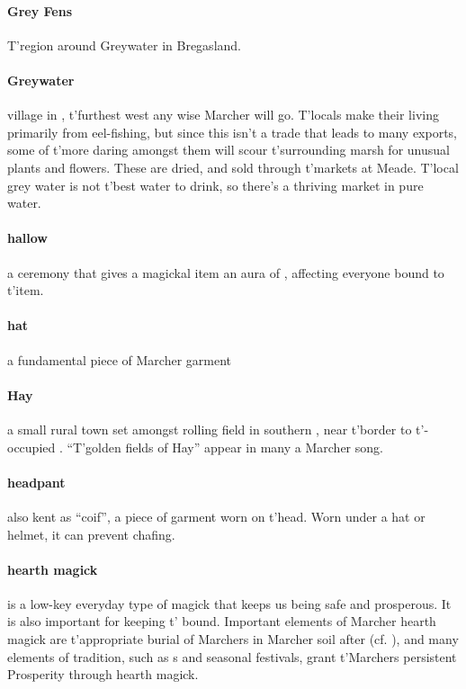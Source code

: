 \paragraph{Grey Fens} T'region around Greywater in Bregasland.
\paragraph{Greywater} village in , t'\allowbreak furthest west any wise Marcher will go. T'locals make their living primarily from eel-fishing, but since this isn’t a trade that leads to many exports, some of t'\allowbreak more daring amongst them will scour t'\allowbreak surrounding marsh for unusual plants and flowers. These are dried, and sold through t'\allowbreak markets at Meade. T'local grey water is not t'\allowbreak best water to drink, so there's a thriving market in pure water.
\paragraph{hallow} a ceremony that gives a magickal item an aura of , affecting everyone bound to t'\allowbreak item.
\paragraph{hat} a fundamental piece of Marcher garment 
\paragraph{Hay} a small rural town set amongst rolling field in southern , near t'\allowbreak border to t'\allowbreak {}-occupied . “T'golden fields of Hay” appear in many a Marcher song.
\paragraph{headpant} also kent as “coif”, a piece of garment worn on t'\allowbreak head. Worn under a hat or helmet, it can prevent chafing.
\paragraph{hearth magick} is a low-key everyday type of magick that keeps us being safe and prosperous. It is also important for keeping t'\allowbreak {} bound. Important elements of Marcher hearth magick are t'\allowbreak appropriate burial of Marchers in Marcher soil after  (cf. ), and many elements of tradition, such as s and seasonal festivals, grant t'\allowbreak Marchers persistent Prosperity through hearth magick.
